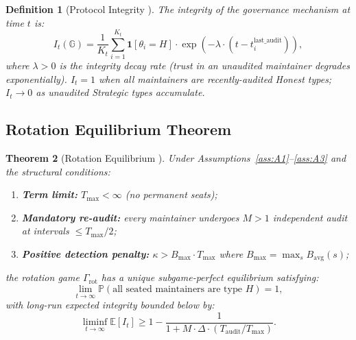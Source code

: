 \documentclass[12pt,a4paper]{article}
\newtheorem{theorem}{Theorem}[section]
\newtheorem{definition}[theorem]{Definition}
\theoremstyle{definition}
\newcommand{\Community}{\mathbb{G}}
\newcommand{\E}{\mathbb{E}}
\newcommand{\Pbb}{\mathbb{P}}
\newcommand{\ind}[1]{\mathbf{1}[#1]}
\begin{document}
\begin{definition}[Protocol Integrity ]
\label{def:integrity}
The integrity of the governance mechanism at time $t$ is:
\begin{equation}
    I_t(\Community) = \frac{1}{K_t} \sum_{i=1}^{K_t} \ind{\theta_i = H} \cdot \exp\left(-\lambda \cdot (t - t_i^{\text{last\_audit}})\right),
    \label{eq:integrity}
\end{equation}
where $\lambda > 0$ is the integrity decay rate (trust in an unaudited maintainer degrades exponentially). $I_t = 1$ when all maintainers are recently-audited Honest types; $I_t \to 0$ as unaudited Strategic types accumulate.
\end{definition}
\subsection{Rotation Equilibrium Theorem}
\begin{theorem}[Rotation Equilibrium ]
\label{thm:rotation}
Under Assumptions~\ref{ass:A1}--\ref{ass:A3} and the structural conditions:
\begin{enumerate}[label=(C\arabic*),leftmargin=*]
    \item \textbf{Term limit:} $T_{\max} < \infty$ (no permanent seats);
    \item \textbf{Mandatory re-audit:} every maintainer undergoes $M>1$ independent audit at intervals $\leq T_{\max}/2$;
    \item \textbf{Positive detection penalty:} $\kappa > B_{\max} \cdot T_{\max}$ where $B_{\max} = \max_s B_{\text{avg}}(s)$;
\end{enumerate}
the rotation game $\Gamma_{\text{rot}}$ has a unique subgame-perfect equilibrium satisfying:
\begin{equation}
    \lim_{t \to \infty} \Pbb(\text{all seated maintainers are type } H) = 1,
    \label{eq:all_honest}
\end{equation}
with long-run expected integrity bounded below by:
\begin{equation}
    \liminf_{t \to \infty} \E[I_t] \geq 1 - \frac{1}{1 + M \cdot \Delta \cdot (T_{\text{audit}} / T_{\max})}.
    \label{eq:integrity_bound}
\end{equation}
\end{theorem}
\end{document}

